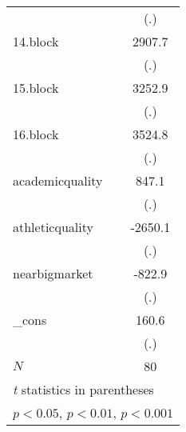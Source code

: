 {\begin{tabular}{l*{1}{c}}
            &         (.)         \\
[1em]
14.block    &      2907.7         \\
            &         (.)         \\
[1em]
15.block    &      3252.9         \\
            &         (.)         \\
[1em]
16.block    &      3524.8         \\
            &         (.)         \\
[1em]
academicquality&       847.1         \\
            &         (.)         \\
[1em]
athleticquality&     -2650.1         \\
            &         (.)         \\
[1em]
nearbigmarket&      -822.9         \\
            &         (.)         \\
[1em]
\_cons      &       160.6         \\
            &         (.)         \\
\hline
\(N\)       &          80         \\
\hline\hline
\multicolumn{2}{l}{\footnotesize \textit{t} statistics in parentheses}\\
\multicolumn{2}{l}{\footnotesize \sym{*} \(p<0.05\), \sym{**} \(p<0.01\), \sym{***} \(p<0.001\)}\\
\end{tabular}
}
